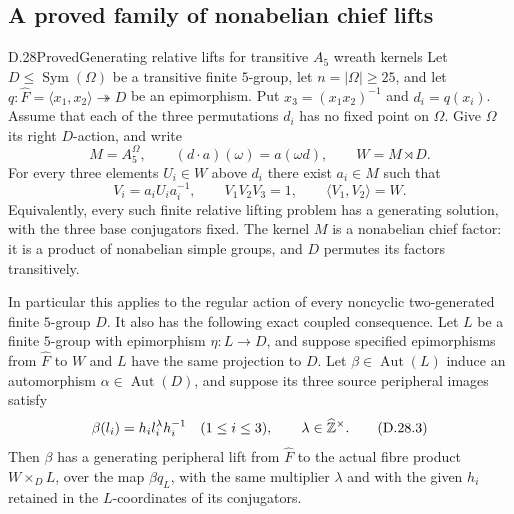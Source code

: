 \subsection{A proved family of nonabelian chief lifts}

\begin{statement}{D.28}{Proved}{Generating relative lifts for transitive $A_5$ wreath kernels}
Let $D\leq\operatorname{Sym}(\Omega)$ be a transitive finite
$5$-group, let $n=|\Omega|\geq25$, and let
$q:\widehat F=\langle x_1,x_2\rangle\twoheadrightarrow D$
be an epimorphism.  Put $x_3=(x_1x_2)^{-1}$ and $d_i=q(x_i)$.
Assume that each of the three permutations $d_i$ has no fixed
point on $\Omega$.  Give $\Omega$ its right $D$-action, and
write
\[
 M=A_5^{\Omega},\qquad
 (d\cdot a)(\omega)=a(\omega d),\qquad W=M\rtimes D.
 \tag{D.28.1}
\]
For every three elements $U_i\in W$ above $d_i$ there exist
$a_i\in M$ such that
\[
 V_i=a_iU_ia_i^{-1},\qquad
 V_1V_2V_3=1,\qquad\langle V_1,V_2\rangle=W.
 \tag{D.28.2}
\]
Equivalently, every such finite relative lifting problem has
a generating solution, with the three base conjugators fixed.
The kernel $M$ is a nonabelian chief factor: it is a product
of nonabelian simple groups, and $D$ permutes its factors
transitively.

In particular this applies to the regular action of every
noncyclic two-generated finite $5$-group $D$.  It also has
the following exact coupled consequence.  Let $L$ be a finite
$5$-group with epimorphism $\eta:L\to D$, and suppose
specified epimorphisms from $\widehat F$ to $W$ and $L$
have the same projection to $D$.  Let
$\beta\in\operatorname{Aut}(L)$ induce an automorphism
$\alpha\in\operatorname{Aut}(D)$, and suppose its three
source peripheral images satisfy
\[
       \beta(l_i)=h_i l_i^\lambda h_i^{-1}
       \quad(1\leq i\leq3),\qquad
       \lambda\in\widehat{\mathbb Z}^\times.
 \tag{D.28.3}
\]
Then $\beta$ has a generating peripheral lift from
$\widehat F$ to the actual fibre product $W\times_D L$,
over the map $\beta q_L$, with the same multiplier
$\lambda$ and with the given $h_i$ retained in the
$L$-coordinates of its conjugators.
\end{statement}

